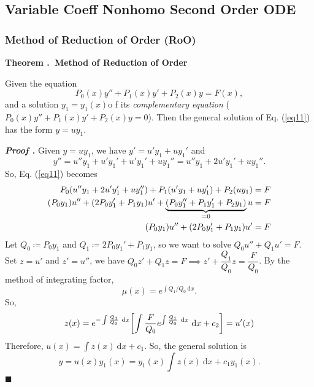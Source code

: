 \documentclass[12pt, a4paper]{article}
\newcounter{index}[subsection]
\newenvironment*{thm}[1]{\begin{tcolorbox}\par\noindent\textbf{Theorem \thesubsection.\stepcounter{index}\theindex\ #1} \par}{\par\end{tcolorbox}}
\newcounter{nprf}[subsection]
\newenvironment*{prf}{\par\indent\textbf{\textit{Proof \stepcounter{nprf}\thenprf.}}}{\hfill$\blacksquare$\par}
\def\d{{\mathrm{d}}}
\begin{document}
\subsection{Variable Coeff Nonhomo Second Order ODE}
\subsubsection{Method of Reduction of Order (RoO)}
\begin{thm}{Method of Reduction of Order}
	Given the equation \begin{equation}\label{eq11}P_0(x)y''+P_1(x)y'+P_2(x)y=F(x),\end{equation} and a solution $y_1=y_1(x)$o f its \textit{complementary equation} ($P_0(x)y''+P_1(x)y'+P_2(x)y=0$). Then the general solution of Eq. (\ref{eq11}) has the form $y=uy_1$.
\end{thm}
\begin{prf}
	Given $y=uy_1$, we have $y'=u'y_1+uy_1'$ and \[y''=u''y_1+u'y_1'+u'y_1'+uy_1''=u''y_1+2u'y_1'+uy_1''.\] So, Eq. (\ref{eq11}) becomes \begin{align*}P_0\qty(u''y_1+2u'y_1'+uy_1'')+P_1\qty(u'y_1+uy_1')+P_2(uy_1)&=F\\(P_0y_1)u''+(2P_0y_1'+P_1y_1)u'+\underbrace{(P_0y_1''+P_1y_1'+P_2y_1)}_{=0}u&=F\\(P_0y_1)u''+(2P_0y_1'+P_1y_1)u'&=F\end{align*} Let $Q_0\coloneqq P_0y_1$ and $Q_1\coloneqq 2P_0y_1'+P_1y_1$, so we want to solve $Q_0u''+Q_1u'=F$. Set $z=u'$ and $z'=u''$, we have $Q_0z'+Q_1z=F\implies z'+\dfrac{Q_1}{Q_0}z=\dfrac{F}{Q_0}$. By the method of integrating factor, \[\mu(x)=e^{\int Q_1/Q_0\ \d{x}}.\] So, \[z(x)=e^{-\int\frac{Q_1}{Q_0}\ \d{x}}\qty[\int\dfrac{F}{Q_0}e^{\int\frac{Q_1}{Q_0}\ \d{x}}\ \d{x}+c_2]=u'(x)\]Therefore, $u(x)=\int z(x)\ \d{x} +c_1$. So, the general solution is \[y=u(x)y_1(x)=y_1(x)\int z(x)\ \d{x}+c_1y_1(x).\]
\end{prf}
\end{document}

